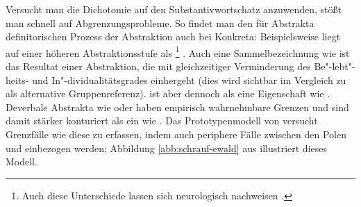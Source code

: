Versucht man die Dichotomie    auf den Substantivwortschatz  anzuwenden, stößt man schnell auf Abgrenzungsprobleme. So findet man den für Abstrakta  definitorischen Prozess der Abstraktion auch bei  Konkreta: Beispielsweise liegt  auf einer höheren Abstraktionsstufe als \footnote{Auch diese Unterschiede lassen sich neurologisch nachweisen \parencite[s.][]{Ghio2013}.} \parencite[274]{Ewald1992}. Auch eine Sammelbezeichnung wie  ist das Resultat einer Abstraktion, die mit gleichzeitiger Verminderung des Be"-lebt"-heits- und In"-dividualitätsgrades einhergeht (dies wird sichtbar im Vergleich zu  als alternative Gruppenreferenz).  ist aber dennoch   als eine Eigenschaft wie . Deverbale Abstrakta  wie  oder  haben empirisch wahrnehmbare Grenzen und sind damit stärker konturiert als ein  wie . Das Prototypenmodell von \textcite[279--280]{Ewald1992} versucht Grenzfälle wie diese zu erfassen, indem auch periphere Fälle zwischen den Polen   und   einbezogen werden; Abbildung \ref{abb:schrauf-ewald} aus \textcite{Schrauf2011} illustriert dieses Modell.  

